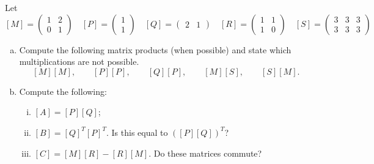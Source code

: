 \documentclass[12pt]{article} %
\begin{document}
\newpage
\begin{problem}
Let
\vspace*{.25cm}
\[
[M]= \begin{pmatrix} 1 & 2\\ 0 & 1 \end{pmatrix} \quad 
[P]=\begin{pmatrix} 1 \\ 1 \end{pmatrix} \quad 
[Q]=\begin{pmatrix} 2 & 1 \end{pmatrix} \quad
[R] = \begin{pmatrix} 1 & 1 \\ 1 & 0 \end{pmatrix} \quad
[S]=\begin{pmatrix} 3 & 3 & 3 \\ 3 & 3 & 3 \end{pmatrix}
\]
\vspace*{.25cm}
\begin{enumerate}[(a)]
    \item Compute the following matrix products (when possible) and state which multiplications are not possible.
\[
[M][M], \qquad [P][P], \qquad [Q][P], \qquad [M][S], \qquad [S][M].
\]
    \item Compute the following:
    \begin{enumerate}[i.]
        \item $[A]=[P][Q]$;
        \item $[B]=[Q]^T[P]^T$. Is this equal to $([P][Q])^T$?
        \item $[C] = [M][R] - [R][M]$. Do these matrices commute?
    \end{enumerate}
\end{enumerate}
\end{problem}
\end{document}

